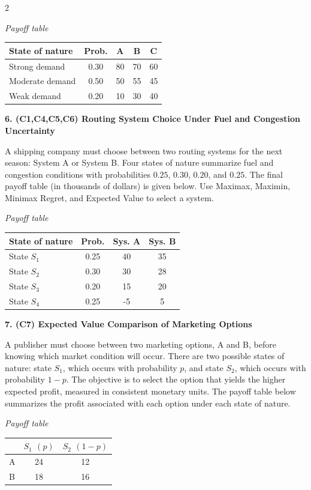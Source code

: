 \documentclass[12pt]{article}
\newcommand{\SubsectionBox}[1]{%
	\noindent\colorbox{gray!30}{%
		\parbox{\linewidth}{\textbf{#1}}%
	}\par\vspace{0.35cm}%
}
\begin{document}
\begin{multicols}{2}
		\begin{center}
			\textit{Payoff table} \\
			\begin{tabular}{l c c c c}
				\hline
				State of nature & Prob. & A & B & C \\
				\hline
				Strong demand & 0.30 & 80 & 70 & 60 \\
				Moderate demand & 0.50 & 50 & 55 & 45 \\
				Weak demand & 0.20 & 10 & 30 & 40 \\
				\hline
			\end{tabular}
		\end{center}

		\vspace{0.25cm}
		\SubsectionBox{6. (C1,C4,C5,C6) Routing System Choice Under Fuel and Congestion Uncertainty}\vspace{-0.25cm}
		A shipping company must choose between two routing systems for the next season: System A or System B.
		Four states of nature summarize fuel and congestion conditions with probabilities $0.25$, $0.30$, $0.20$, and $0.25$.
		The final payoff table (in thousands of dollars) is given below. Use Maximax, Maximin, Minimax Regret, and Expected Value to select a system.

		\begin{center}
			\textit{Payoff table} \\
			\begin{tabular}{l c c c}
				\hline
				State of nature & Prob. & Sys. A & Sys. B \\
				\hline
				State $S_1$ & 0.25 & 40 & 35 \\
				State $S_2$ & 0.30 & 30 & 28 \\
				State $S_3$ & 0.20 & 15 & 20 \\
				State $S_4$ & 0.25 & -5 & 5 \\
				\hline
			\end{tabular}
		\end{center}

		\vspace{0.25cm}
		\SubsectionBox{7. (C7) Expected Value Comparison of Marketing Options}\vspace{-0.25cm}
		A publisher must choose between two marketing options, A and B, before knowing which market condition will occur.
		There are two possible states of nature: state $S_1$, which occurs with probability $p$, and state $S_2$, which occurs with probability $1-p$.
		The objective is to select the option that yields the higher expected profit, measured in consistent monetary units.
		The payoff table below summarizes the profit associated with each option under each state of nature.
		\begin{center}
			\textit{Payoff table} \\
			\begin{tabular}{l c c}
				\hline
				& $S_1$ $(p)$ & $S_2$ $(1-p)$ \\
				\hline
				A & 24 & 12 \\
				B & 18 & 16 \\
				\hline
			\end{tabular}
		\end{center}


\end{multicols}
\end{document}
